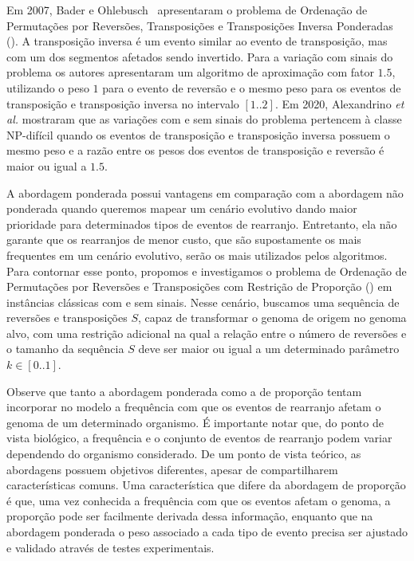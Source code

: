 Em 2007, Bader e Ohlebusch~\cite{2007-bader-ohlebusch} apresentaram o problema de Ordenação de Permutações por Reversões, Transposições e Transposições Inversa Ponderadas (\SbWRTIT). A transposição inversa é um evento similar ao evento de transposição, mas com um dos segmentos afetados sendo invertido. Para a variação com sinais do problema os autores apresentaram um algoritmo de aproximação com fator $1.5$, utilizando o peso $1$ para o evento de reversão e o mesmo peso para os eventos de transposição e transposição inversa no intervalo $[1..2]$. Em 2020, Alexandrino \textit{et al.}\cite{2020b-alexandrino-etal} mostraram que as variações com e sem sinais do problema \SbWRTIT{} pertencem à classe NP-difícil quando os eventos de transposição e transposição inversa possuem o mesmo peso e a razão entre os pesos dos eventos de transposição e reversão é maior ou igual a $1.5$.

A abordagem ponderada possui vantagens em comparação com a abordagem não ponderada quando queremos mapear um cenário evolutivo dando maior prioridade para determinados tipos de eventos de rearranjo. Entretanto, ela não garante que os rearranjos de menor custo, que são supostamente os mais frequentes em um cenário evolutivo, serão os mais utilizados pelos algoritmos. Para contornar esse ponto, propomos e investigamos o problema de Ordenação de Permutações por Reversões e Transposições com Restrição de Proporção (\SbPRT) em instâncias clássicas com e sem sinais. Nesse cenário, buscamos uma sequência de reversões e transposições $S$, capaz de transformar o genoma de origem no genoma alvo, com uma restrição adicional na qual a relação entre o número de reversões e o tamanho da sequência $S$ deve ser maior ou igual a um determinado parâmetro $k \in [0..1]$. 

Observe que tanto a abordagem ponderada como a de proporção tentam incorporar no modelo a frequência com que os eventos de rearranjo afetam o genoma de um determinado organismo. É importante notar que, do ponto de vista biológico, a frequência e o conjunto de eventos de rearranjo podem variar dependendo do organismo considerado. De um ponto de vista teórico, as abordagens possuem objetivos diferentes, apesar de compartilharem características comuns. Uma característica que difere da abordagem de proporção é que, uma vez conhecida a frequência com que os eventos afetam o genoma, a proporção pode ser facilmente derivada dessa informação, enquanto que na abordagem ponderada o peso associado a cada tipo de evento precisa ser ajustado e validado através de testes experimentais.


